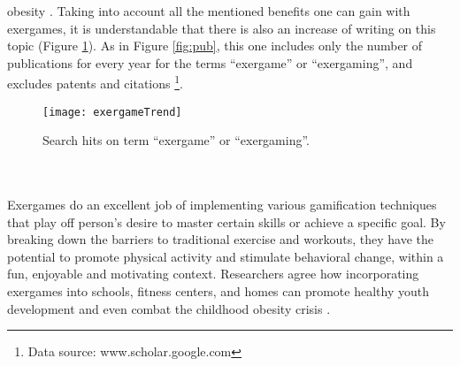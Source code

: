 obesity \cite{taylor2015use, barry2014role, webster2014systematic}.
Taking into account all the mentioned benefits one can gain with exergames, it is understandable that there is also an increase of writing on this topic (Figure \ref{fig:pubEx}). As in Figure \ref{fig:pub}, this one includes only the number of publications for every year for the terms ``exergame'' or ``exergaming'', and excludes patents and citations \footnote{Data source: www.scholar.google.com}. \\
\begin{figure}[h]
    \centering
    \texttt{[image: exergameTrend]}
    \caption{Search hits on term ``exergame'' or ``exergaming''.}
    \label{fig:pubEx}
\end{figure}\\\\
Exergames do an excellent job of implementing various gamification techniques that play off person's desire to master certain skills or achieve a specific goal. By breaking down the barriers to traditional exercise and workouts, they have the potential to promote physical activity and stimulate behavioral change, within a fun, enjoyable and motivating context. Researchers agree how incorporating exergames into schools, fitness centers, and homes can promote healthy youth development and even combat the childhood obesity crisis \cite{staiano2011exergames}.
